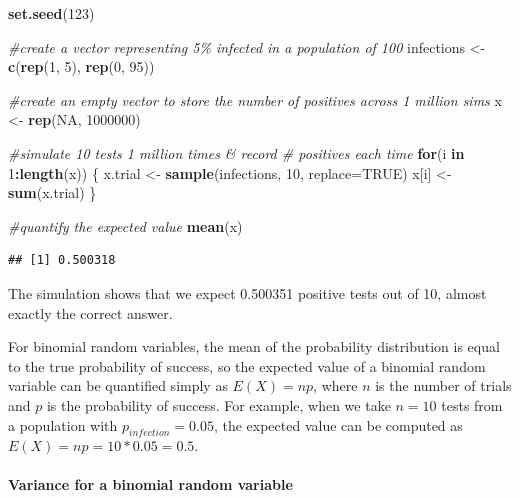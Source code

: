 \documentclass[
]{book}
\newenvironment{Shaded}{\begin{snugshade}}{\end{snugshade}}
\newcommand{\AttributeTok}[1]{\textcolor[rgb]{0.13,0.29,0.53}{#1}}
\newcommand{\CommentTok}[1]{\textcolor[rgb]{0.56,0.35,0.01}{\textit{#1}}}
\newcommand{\ConstantTok}[1]{\textcolor[rgb]{0.56,0.35,0.01}{#1}}
\newcommand{\ControlFlowTok}[1]{\textcolor[rgb]{0.13,0.29,0.53}{\textbf{#1}}}
\newcommand{\DecValTok}[1]{\textcolor[rgb]{0.00,0.00,0.81}{#1}}
\newcommand{\FunctionTok}[1]{\textcolor[rgb]{0.13,0.29,0.53}{\textbf{#1}}}
\newcommand{\NormalTok}[1]{#1}
\newcommand{\OtherTok}[1]{\textcolor[rgb]{0.56,0.35,0.01}{#1}}
\newcommand{\SpecialCharTok}[1]{\textcolor[rgb]{0.81,0.36,0.00}{\textbf{#1}}}
\begin{document}
\begin{Shaded}
\begin{Highlighting}[]
\FunctionTok{set.seed}\NormalTok{(}\DecValTok{123}\NormalTok{)}

\CommentTok{\#create a vector representing 5\% infected in a population of 100}
\NormalTok{infections }\OtherTok{\textless{}{-}} \FunctionTok{c}\NormalTok{(}\FunctionTok{rep}\NormalTok{(}\DecValTok{1}\NormalTok{, }\DecValTok{5}\NormalTok{), }\FunctionTok{rep}\NormalTok{(}\DecValTok{0}\NormalTok{, }\DecValTok{95}\NormalTok{))}

\CommentTok{\#create an empty vector to store the number of positives across 1 million sims}
\NormalTok{x }\OtherTok{\textless{}{-}} \FunctionTok{rep}\NormalTok{(}\ConstantTok{NA}\NormalTok{, }\DecValTok{1000000}\NormalTok{)}

\CommentTok{\#simulate 10 tests 1 million times \& record \# positives each time}
\ControlFlowTok{for}\NormalTok{(i }\ControlFlowTok{in} \DecValTok{1}\SpecialCharTok{:}\FunctionTok{length}\NormalTok{(x)) \{}
\NormalTok{  x.trial }\OtherTok{\textless{}{-}} \FunctionTok{sample}\NormalTok{(infections, }\DecValTok{10}\NormalTok{, }\AttributeTok{replace=}\ConstantTok{TRUE}\NormalTok{)}
\NormalTok{  x[i] }\OtherTok{\textless{}{-}} \FunctionTok{sum}\NormalTok{(x.trial)}
\NormalTok{\}}

\CommentTok{\#quantify the expected value}
\FunctionTok{mean}\NormalTok{(x)}
\end{Highlighting}
\end{Shaded}

\begin{verbatim}
## [1] 0.500318
\end{verbatim}

The simulation shows that we expect 0.500351 positive tests out of 10, almost exactly the correct answer.

For binomial random variables, the mean of the probability distribution is equal to the true probability of success, so the expected value of a binomial random variable can be quantified simply as \(E(X) = np\), where \(n\) is the number of trials and \(p\) is the probability of success. For example, when we take \(n = 10\) tests from a population with \(p_{infection} = 0.05\), the expected value can be computed as \(E(X) = np=10*0.05=0.5\).

\paragraph{Variance for a binomial random variable}\label{variance-for-a-binomial-random-variable}
\end{document}
